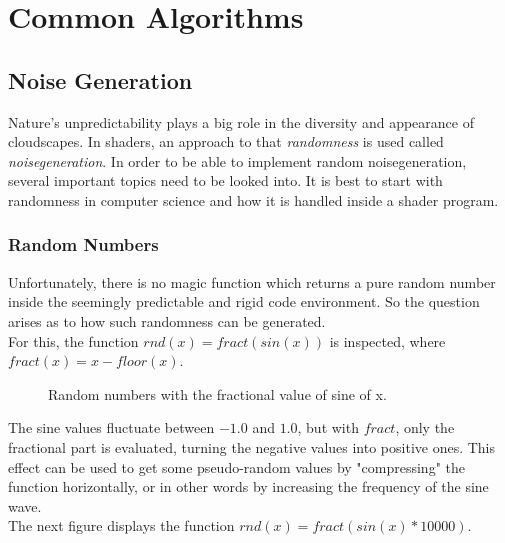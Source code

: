 \section{Common Algorithms}

\subsection{Noise Generation}
\label{section:noise-generation}
Nature's unpredictability plays a big role in the diversity and appearance of cloudscapes. In shaders, an approach to that \textit{randomness} is used called \textit{\gls{noisegeneration}}.
In order to be able to implement random \gls{noisegeneration}, several important topics need to be looked into. It is best to start with randomness in computer science and how it is handled inside a shader program.

\subsubsection{Random Numbers}
Unfortunately, there is no magic function which returns a pure random number inside the seemingly predictable and rigid code environment.
So the question arises as to how such randomness can be generated.
\\
For this, the function $rnd(x) = fract(sin(x))$ is inspected, where $fract(x) = x - floor(x)$.

\begin{figure}[H]
    \centering
    \caption{Random numbers with the fractional value of sine of x.}
\end{figure}

\noindent
The sine values fluctuate between $-1.0$ and $1.0$, but with $fract$, only the fractional part is evaluated, turning the negative values into positive ones.
This effect can be used to get some pseudo-random values by "compressing" the function horizontally, or in other words by increasing the frequency of the sine wave.
\\
The next figure displays the function $rnd(x) = fract(sin(x) * 10000)$.

